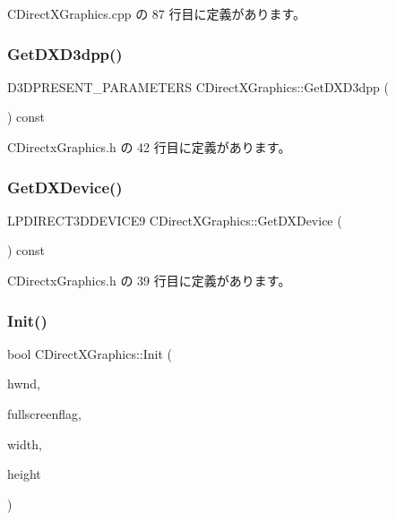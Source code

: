  C\+Direct\+X\+Graphics.\+cpp の 87 行目に定義があります。

\mbox{\label{class_c_direct_x_graphics_a545a40df66af3c68df0c4b412dbf8d6c}} 
\subsubsection{\texorpdfstring{Get\+D\+X\+D3dpp()}{GetDXD3dpp()}}
{\footnotesize\ttfamily D3\+D\+P\+R\+E\+S\+E\+N\+T\+\_\+\+P\+A\+R\+A\+M\+E\+T\+E\+RS C\+Direct\+X\+Graphics\+::\+Get\+D\+X\+D3dpp (\begin{DoxyParamCaption}{ }\end{DoxyParamCaption}) const\hspace{0.3cm}{\ttfamily [inline]}}



 C\+Directx\+Graphics.\+h の 42 行目に定義があります。

\mbox{\label{class_c_direct_x_graphics_ab3fb03fff86412e03c2e1849d0d82eec}} 
\subsubsection{\texorpdfstring{Get\+D\+X\+Device()}{GetDXDevice()}}
{\footnotesize\ttfamily L\+P\+D\+I\+R\+E\+C\+T3\+D\+D\+E\+V\+I\+C\+E9 C\+Direct\+X\+Graphics\+::\+Get\+D\+X\+Device (\begin{DoxyParamCaption}{ }\end{DoxyParamCaption}) const\hspace{0.3cm}{\ttfamily [inline]}}



 C\+Directx\+Graphics.\+h の 39 行目に定義があります。

\mbox{\label{class_c_direct_x_graphics_acb27d62a791eea8193ad09fa6ab06c4c}} 
\subsubsection{\texorpdfstring{Init()}{Init()}}
{\footnotesize\ttfamily bool C\+Direct\+X\+Graphics\+::\+Init (\begin{DoxyParamCaption}\item[{H\+W\+ND}]{hwnd,  }\item[{bool}]{fullscreenflag,  }\item[{int}]{width,  }\item[{int}]{height }\end{DoxyParamCaption})}



